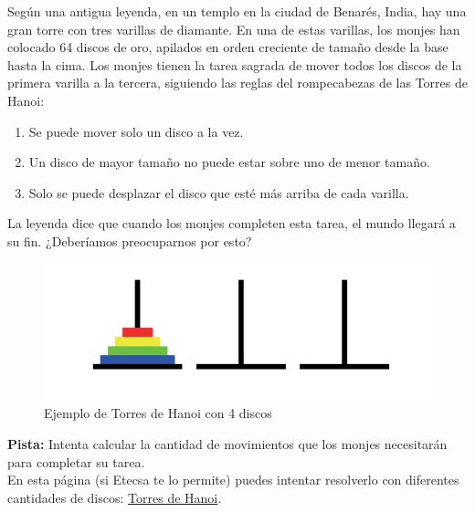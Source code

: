 Según una antigua leyenda, en un templo en la ciudad de Benarés, India, hay una gran torre con tres varillas de diamante. En una de estas varillas, los monjes han colocado 64 discos de oro, apilados en orden creciente de tamaño desde la base hasta la cima. Los monjes tienen la tarea sagrada de mover todos los discos de la primera varilla a la tercera, siguiendo las reglas  del rompecabezas de las Torres de Hanoi:

\begin{enumerate}
	\item Se puede mover solo un disco a la vez.
	\item Un disco de mayor tamaño no puede estar sobre uno de menor tamaño.
	\item Solo se puede desplazar el disco que esté más arriba de cada varilla.
\end{enumerate}

La leyenda dice que cuando los monjes completen esta tarea, el mundo llegará a su fin. ¿Deberíamos preocuparnos por esto?

\begin{figure}[H]
	\centering
	\includegraphics[width=0.45\linewidth]{cp1/hanoi.png}
        \caption{Ejemplo de Torres de Hanoi con 4 discos}
\end{figure}

\textbf{Pista:} Intenta calcular la cantidad de movimientos que los monjes necesitarán para completar su tarea.\\

En esta página (si Etecsa te lo permite) puedes intentar resolverlo con diferentes cantidades de discos: \href{https://www.geogebra.org/m/NqyWJVra}{Torres de Hanoi}.
